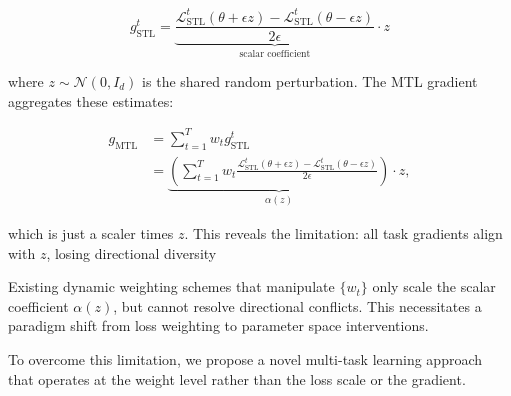 \begin{equation}
    g^t_{\text{STL}} = \underbrace{\frac{\mathcal{L}^t_{\text{STL}}(\theta+\epsilon z) - \mathcal{L}^t_{\text{STL}}(\theta-\epsilon z)}{2\epsilon}}_{\text{scalar coefficient}} \cdot z
\end{equation}

where $z \sim \mathcal{N}(0,I_d)$ is the shared random perturbation. The MTL gradient aggregates these estimates:

\begin{align}
    g_{\text{MTL}} &= \sum_{t=1}^T w_t g^t_{\text{STL}} \\
    &= \underbrace{\left(\sum_{t=1}^T w_t \frac{\mathcal{L}^t_{\text{STL}}(\theta+\epsilon z) - \mathcal{L}^t_{\text{STL}}(\theta-\epsilon z)}{2\epsilon}\right)}_{\alpha(z)} \cdot z,
\end{align}

which is just a scaler times $z$.
This reveals the limitation: all task gradients align with $z$, losing directional diversity

Existing dynamic weighting schemes that manipulate $\{w_t\}$ only scale the scalar coefficient $\alpha(z)$, but cannot resolve directional conflicts. This necessitates a paradigm shift from loss weighting to parameter space interventions.

To overcome this limitation, we propose a novel multi-task learning approach that operates at the weight level rather than the loss scale or the gradient.